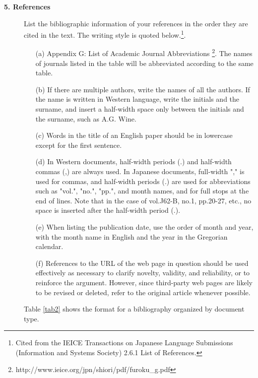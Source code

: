 \begin{description}
\item[{\bfseries 5. References}]
List the bibliographic information of your references in the order they are cited in the text. The writing style is quoted below.\footnote{Cited from the IEICE Transactions on Japanese Language Submissions (Information and Systems Society) 2.6.1 List of References.}.
\begin{itemize}
\item[(a)] Appendix G: List of Academic Journal Abbreviations \footnote{http://www.ieice.org/jpn/shiori/pdf/furoku\_g.pdf}. The names of journals listed in the table will be abbreviated according to the same table.
\item[(b)] If there are multiple authors, write the names of all the authors. If the name is written in Western language, write the initials and the surname, and insert a half-width space only between the initials and the surname, such as A.G. Wine.
\item[(c)] Words in the title of an English paper should be in lowercase except for the first sentence.
\item[(d)] In Western documents, half-width periods (.) and half-width commas (,) are always used. In Japanese documents, full-width "," is used for commas, and half-width periods (.) are used for abbreviations such as "vol.", "no.", "pp.", and month names, and for full stops at the end of lines. Note that in the case of vol.J62-B, no.1, pp.20-27, etc., no space is inserted after the half-width period (.).
\item[(e)] When listing the publication date, use the order of month and year, with the month name in English and the year in the Gregorian calendar.
\item[(f)] References to the URL of the web page in question should be used effectively as necessary to clarify novelty, validity, and reliability, or to reinforce the argument. However, since third-party web pages are likely to be revised or deleted, refer to the original article whenever possible.
\end{itemize}

Table \ref{tab2} shows the format for a bibliography organized by document type.
\end{description}


